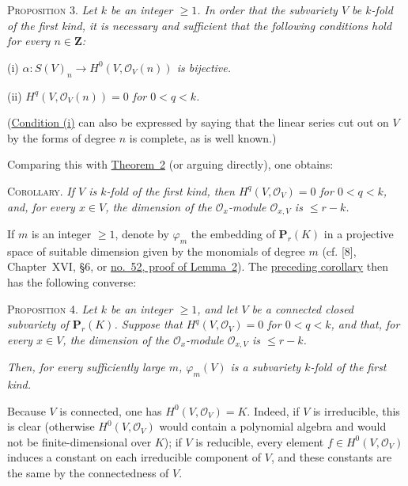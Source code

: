 \label{fac:III:5:no:77:prop:3}
\textsc{Proposition 3.} \textit{Let $k$ be an integer $\geq1$. In order
that the subvariety $V$ be $k$-fold of the first kind, it is necessary
and sufficient that the following conditions hold for every
$n\in\mathbf Z$:}

\label{fac:III:5:no:77:prop:3:i}
(i) \textit{$\alpha:S(V)_n\to H^0(V,\mathcal O_V(n))$ is bijective.}

\label{fac:III:5:no:77:prop:3:ii}
(ii) \textit{$H^q(V,\mathcal O_V(n))=0$ for $0<q<k$.}

(\hyperref[fac:III:5:no:77:prop:3:i]{Condition (i)} can also be expressed by saying that the linear series
cut out on $V$ by the forms of degree $n$ is complete, as is well
known.)

Comparing this with \hyperref[fac:III:5:no:74:thm:2]{Theorem~2} (or
arguing directly), one obtains:

\label{fac:III:5:no:77:cor:local}
\textsc{Corollary.} \textit{If $V$ is $k$-fold of the first kind, then
$H^q(V,\mathcal O_V)=0$ for $0<q<k$, and, for every $x\in V$, the
dimension of the $\mathcal O_x$-module $\mathcal O_{x,V}$ is
$\leq r-k$.}

If $m$ is an integer $\geq1$, denote by $\varphi_m$ the embedding of
$\mathbf P_r(K)$ in a projective space of suitable dimension given by
the monomials of degree $m$ (cf. [8], Chapter~XVI, \S6, or
\hyperref[fac:III:1:lemma:2]{no.~52, proof of Lemma~2}). The
\hyperref[fac:III:5:no:77:cor:local]{preceding
corollary} then has the following converse:

\label{fac:III:5:no:77:prop:4}
\textsc{Proposition 4.} \textit{Let $k$ be an integer $\geq1$, and let
$V$ be a connected closed subvariety of $\mathbf P_r(K)$. Suppose that
$H^q(V,\mathcal O_V)=0$ for $0<q<k$, and that, for every $x\in V$, the
dimension of the $\mathcal O_x$-module $\mathcal O_{x,V}$ is
$\leq r-k$.}

\textit{Then, for every sufficiently large $m$, $\varphi_m(V)$ is a
subvariety $k$-fold of the first kind.}

Because $V$ is connected, one has $H^0(V,\mathcal O_V)=K$. Indeed, if
$V$ is irreducible, this is clear (otherwise
$H^0(V,\mathcal O_V)$ would contain a polynomial algebra and would not
be finite-dimensional over $K$); if $V$ is reducible, every element
$f\in H^0(V,\mathcal O_V)$ induces a constant on each irreducible
component of $V$, and these constants are the same by the connectedness
of $V$.

